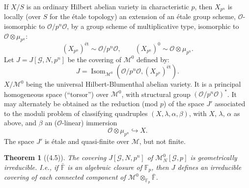 \documentclass[12pt,a4paper]{article}
\theoremstyle{plain}
\newtheorem{theorem}{Theorem}[section]
\theoremstyle{definition}
\DeclareMathOperator{\Isom}{Isom}
\newcommand{\OO}{\mathcal{O}}
\newcommand{\F}{\mathbb{F}}
\newcommand{\et}{\text{\'et}}
\begin{document}
If $X/S$ is an ordinary Hilbert abelian variety in characteristic $p$, then $X_{p^n}$ is locally (over $S$ for the \'etale topology) an extension of an \'etale group scheme, $\OO$-isomorphic to $\OO/p^n\OO$, by a group scheme of multiplicative type, isomorphic to $\OO\otimes\mu_{p^n}$:
\[
(X_{p^n})^{\et}\sim\OO/p^n\OO,\qquad(X_{p^n})^0\sim\OO\otimes\mu_{p^n}.
\]
Let $J=J[\mathscr{G},N,p^n]$ be the covering of $\mathscr{M}^0$ defined by:
\[
J=\Isom_{\mathscr{M}^0}(\OO/p^n\OO,(X_{p^n})^{\et}).
\]
$X/\mathscr{M}^0$ being the universal Hilbert-Blumenthal abelian variety. It is a principal homogeneous space (``torsor'') over $\mathscr{M}^0$, with structural group $(\OO/p^n\OO)^*$. It may alternately be obtained as the reduction (mod $p$) of the space $J'$ associated to the moduli problem of classifying quadruples $(X,\lambda,\alpha,\beta)$, with $X$, $\lambda$, $\alpha$ as above, and $\beta$ an ($\OO$-linear) immersion
\[
\OO\otimes\mu_{p^n}\hookrightarrow X.
\]
The space $J'$ is \'etale and quasi-finite over $\mathscr{M}$, but not finite.

\begin{theorem}[(4.5)]\label{thm:irreducible}
The covering $J[\mathscr{G},N,p^n]$ of $\mathscr{M}^0_N[\mathscr{G},p]$ is geometrically irreducible. I.e., if $\bar{\F}$ is an algebraic closure of $\F_p$, then $J$ defines an irreducible covering of each connected component of $\mathscr{M}^0\otimes_{\F_p}\bar{\F}$.
\end{theorem}
\end{document}
